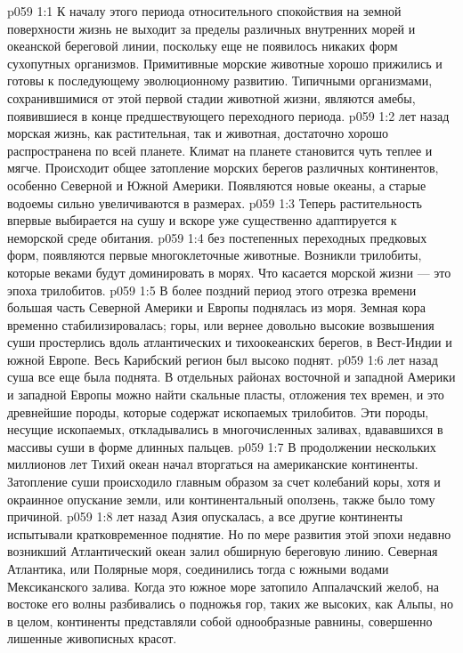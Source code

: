 \vs p059 1:1 К началу этого периода относительного спокойствия на земной поверхности жизнь не выходит за пределы различных внутренних морей и океанской береговой линии, поскольку еще не появилось никаких форм сухопутных организмов. Примитивные морские животные хорошо прижились и готовы к последующему эволюционному развитию. Типичными организмами, сохранившимися от этой первой стадии животной жизни, являются амебы, появившиеся в конце предшествующего переходного периода.
\vs p059 1:2 \pc {} лет назад морская жизнь, как растительная, так и животная, достаточно хорошо распространена по всей планете. Климат на планете становится чуть теплее и мягче. Происходит общее затопление морских берегов различных континентов, особенно Северной и Южной Америки. Появляются новые океаны, а старые водоемы сильно увеличиваются в размерах.
\vs p059 1:3 Теперь растительность впервые выбирается на сушу и вскоре уже существенно адаптируется к неморской среде обитания.
\vs p059 1:4  без постепенных переходных предковых форм, появляются первые многоклеточные животные. Возникли трилобиты, которые веками будут доминировать в морях. Что касается морской жизни --- это эпоха трилобитов.
\vs p059 1:5 В более поздний период этого отрезка времени большая часть Северной Америки и Европы поднялась из моря. Земная кора временно стабилизировалась; горы, или вернее довольно высокие возвышения суши простерлись вдоль атлантических и тихоокеанских берегов, в Вест\hyp{}Индии и южной Европе. Весь Карибский регион был высоко поднят.
\vs p059 1:6 \pc {} лет назад суша все еще была поднята. В отдельных районах восточной и западной Америки и западной Европы можно найти скальные пласты, отложения тех времен, и это древнейшие породы, которые содержат ископаемых трилобитов. Эти породы, несущие ископаемых, откладывались в многочисленных заливах, вдававшихся в массивы суши в форме длинных пальцев.
\vs p059 1:7 В продолжении нескольких миллионов лет Тихий океан начал вторгаться на американские континенты. Затопление суши происходило главным образом за счет колебаний коры, хотя и окраинное опускание земли, или континентальный оползень, также было тому причиной.
\vs p059 1:8 \pc {} лет назад Азия опускалась, а все другие континенты испытывали кратковременное поднятие. Но по мере развития этой эпохи недавно возникший Атлантический океан залил обширную береговую линию. Северная Атлантика, или Полярные моря, соединились тогда с южными водами Мексиканского залива. Когда это южное море затопило Аппалачский желоб, на востоке его волны разбивались о подножья гор, таких же высоких, как Альпы, но в целом, континенты представляли собой однообразные равнины, совершенно лишенные живописных красот.
